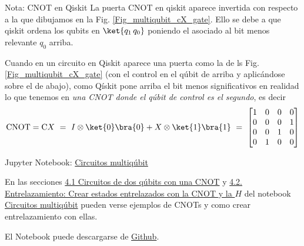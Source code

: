 \documentclass[a4paper,11pt]{book} %
\numberwithin{equation}{chapter}
\newcommand{\cg}[1]{{\rm C}#1}
\begin{document}
	\begin{mybox_blue}{Nota: CNOT en Qiskit}
	La puerta CNOT en qiskit aparece invertida con respecto a la que dibujamos en la Fig. \ref{Fig_multiqubit_cX_gate}. Ello se debe a que qiskit ordena 
	los qubits en $\ket{q_1 \, q_0}$ poniendo el asociado al bit menos relevante $q_0$ arriba. 
	
	\vspace{0.3cm}
	Cuando en un circuito en Qiskit aparece una puerta como la de ls Fig. \ref{Fig_multiqubit_cX_gate} (con el control en el qúbit de arriba y aplicándose sobre el de abajo), como Qískit pone arriba el 
	bit menos significativos en realidad lo que tenemos en \textit{una CNOT donde el qúbit de control es el segundo}, es decir
		\begin{equation}
		\hbox{CNOT} = \cg{X} ~=~ I \otimes \ket{0}\bra{0} + X \otimes \ket{1}\bra{1} 
		~=~ \begin{bmatrix} 1 & 0 & 0 & 0 \\ 0 & 0 & 0 & 1 \\ 0 & 0 & 1 & 0 \\ 0 & 1 & 0 & 0\end{bmatrix}
		\end{equation}
	\end{mybox_blue}
	
	\begin{mybox_orange}{Jupyter Notebook: \href{https://www.scbi.uma.es/web/wp-content/uploads/Jupyterbook/CICC_UMA/Notebooks/html/docs/Part_01/Chapter_03-Circuitos_Multiqubits_myst.html}{Circuitos multiqúbit}}
	
	
	En las secciones \href{https://www.scbi.uma.es/web/wp-content/uploads/Jupyterbook/CICC_UMA/Notebooks/html/docs/Part_01/Chapter_04-Circuitos_Multiqubits_myst.html#circuitos-de-dos-qubits-con-una-cnot}{4.1 Circuitos de dos qúbits con una CNOT} y \href{https://www.scbi.uma.es/web/wp-content/uploads/Jupyterbook/CICC_UMA/Notebooks/html/docs/Part_01/Chapter_04-Circuitos_Multiqubits_myst.html#entrelazamiento-crear-estados-entrelazados-con-la-cnot-y-la-h}{4.2. Entrelazamiento: Crear estados entrelazados con la CNOT y la $H$} del notebook \href{https://www.scbi.uma.es/web/wp-content/uploads/Jupyterbook/CICC_UMA/Notebooks/html/docs/Part_01/Chapter_04-Circuitos_Multiqubits_myst.html}{Circuitos multiqúbit} pueden verse ejemplos de CNOTs y como crear entrelazamiento con ellas.
	
	El Notebook puede descargarse de \href{https://github.com/davidcb98/CICC_UMA/blob/master/Notebooks/Part_01/Chapter_04-Circuitos_Multiqubits.ipynb}{Github}.
	\end{mybox_orange}
    
\end{document}

